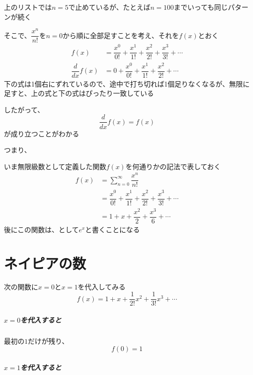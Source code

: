 \documentclass[../book_jiriki_calc]{subfiles}
\begin{document}
上のリストでは$n=5$で止めているが、たとえば$n=100$までいっても同じパターンが続く

\br

そこで、$\dfrac{x^n}{n!}$を$n=0$から順に全部足すことを考え、それを$f(x)$とおく
\begin{align}
  f(x)              & = \dfrac{x^0}{0!} + \dfrac{x^1}{1!} + \dfrac{x^2}{2!} + \dfrac{x^3}{3!} + \cdots \\
  \dfrac{d}{dx}f(x) & = 0 + \dfrac{x^0}{0!} + \dfrac{x^1}{1!} + \dfrac{x^2}{2!} + \cdots
\end{align}
下の式は1個右にずれているので、途中で打ち切れば1個足りなくなるが、無限に足すと、上の式と下の式はぴったり一致している

したがって、
\begin{equation}
  \dfrac{d}{dx}f(x) = f(x)
\end{equation}
が成り立つことがわかる

つまり、

\br

いま無限級数として定義した関数$f(x)$を何通りかの記法で表しておく
\begin{align}
  f(x) & = \sum_{n=0}^{\infty} \dfrac{x^n}{n!}                                            \\
       & = \dfrac{x^0}{0!} + \dfrac{x^1}{1!} + \dfrac{x^2}{2!} + \dfrac{x^3}{3!} + \cdots \\
       & = 1 + x + \dfrac{x^2}{2} + \dfrac{x^3}{6} + \cdots
\end{align}
後にこの関数は、として$e^x$と書くことになる

\section{ネイピアの数}

次の関数に$x=0$と$x=1$を代入してみる
\begin{equation}
  f(x) = 1 + x + \dfrac{1}{2!}x^2 + \dfrac{1}{3!}x^3 + \cdots
\end{equation}

\sectionline

\subparagraph{$x=0$を代入すると}

最初の$1$だけが残り、
\begin{equation}
  f(0) = 1
\end{equation}

\sectionline

\subparagraph{$x=1$を代入すると}
\end{document}
